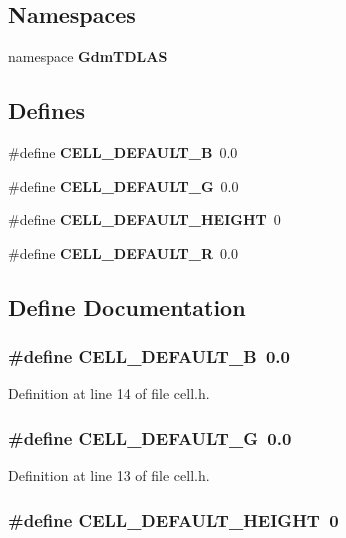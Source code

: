 \subsection*{Namespaces}
\begin{DoxyCompactItemize}
\item 
namespace {\bf GdmTDLAS}
\end{DoxyCompactItemize}
\subsection*{Defines}
\begin{DoxyCompactItemize}
\item 
\#define {\bf CELL\_\-DEFAULT\_\-B}~0.0
\item 
\#define {\bf CELL\_\-DEFAULT\_\-G}~0.0
\item 
\#define {\bf CELL\_\-DEFAULT\_\-HEIGHT}~0
\item 
\#define {\bf CELL\_\-DEFAULT\_\-R}~0.0
\end{DoxyCompactItemize}


\subsection{Define Documentation}
\subsubsection[{CELL\_\-DEFAULT\_\-B}]{\setlength{\rightskip}{0pt plus 5cm}\#define CELL\_\-DEFAULT\_\-B~0.0}\label{cell_8h_aa2ced100b1b7c66c8e277c2cd6587bf6}


Definition at line 14 of file cell.h.

\subsubsection[{CELL\_\-DEFAULT\_\-G}]{\setlength{\rightskip}{0pt plus 5cm}\#define CELL\_\-DEFAULT\_\-G~0.0}\label{cell_8h_a18d783c3167cc9a555a5041a5dffbfc8}


Definition at line 13 of file cell.h.

\subsubsection[{CELL\_\-DEFAULT\_\-HEIGHT}]{\setlength{\rightskip}{0pt plus 5cm}\#define CELL\_\-DEFAULT\_\-HEIGHT~0}\label{cell_8h_add08b72f8d4cc3757bdeeeb741d4e15f}


